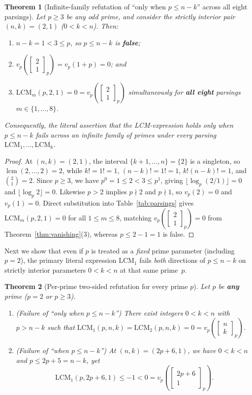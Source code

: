 \documentclass[11pt,a4paper]{article}
\newtheorem{theorem}{Theorem}[section]
\theoremstyle{definition}
\theoremstyle{remark}
\newcommand{\qbinom}[3]{\begin{bmatrix} #1 \\ #2 \end{bmatrix}_{#3}}
\newcommand{\lcm}{\operatorname{lcm}}
\begin{document}
\begin{theorem}[Infinite-family refutation of ``only when $p \le n - k$'' across all eight parsings]
\label{thm:odd-family}
Let $p \ge 3$ be any odd prime, and consider the strictly interior pair
$(n,k) = (2,1)$ ($0 < k < n$). Then:
\begin{enumerate}
  \item $n - k = 1 < 3 \le p$, so $p \le n - k$ is \textbf{false};
  \item $v_p\!\left(\qbinom{2}{1}{p}\right) = v_p(1 + p) = 0$; and
  \item $\mathrm{LCM}_m(p,2,1) = 0 = v_p\!\left(\qbinom{2}{1}{p}\right)$
    simultaneously for \textbf{all eight} parsings $m \in \{1,\dots,8\}$.
\end{enumerate}
Consequently, the literal assertion that the LCM-expression holds \emph{only when}
$p \le n - k$ fails across an infinite family of primes under every parsing
$\mathrm{LCM}_1,\dots,\mathrm{LCM}_8$.
\end{theorem}

\begin{proof}
At $(n,k) = (2,1)$, the interval $\{k+1,\dots,n\} = \{2\}$ is a singleton, so
$\lcm(2,\dots,2) = 2$, while $k! = 1! = 1$, $(n-k)! = 1! = 1$, $k!(n-k)! = 1$, and
$\binom{2}{1} = 2$. Since $p \ge 3$, we have $p^0 = 1 \le 2 < 3 \le p^1$, giving
$\lfloor \log_p(2/1)\rfloor = 0$ and $\lfloor \log_p 2\rfloor = 0$. Likewise $p > 2$
implies $p \nmid 2$ and $p \nmid 1$, so $v_p(2) = 0$ and $v_p(1) = 0$. Direct
substitution into Table~\ref{tab:parsings} gives $\mathrm{LCM}_m(p,2,1) = 0$ for all
$1 \le m \le 8$, matching $v_p\!\left(\qbinom{2}{1}{p}\right) = 0$ from
Theorem~\ref{thm:vanishing}(3), whereas $p \le 2 - 1 = 1$ is false.
\end{proof}

Next we show that even if $p$ is treated as a \emph{fixed} prime parameter (including
$p = 2$), the primary literal expression $\mathrm{LCM}_1$ fails \emph{both} directions
of $p \le n - k$ on strictly interior parameters $0 < k < n$ at that same prime~$p$.

\begin{theorem}[Per-prime two-sided refutation for every prime $p$]
\label{thm:per-prime}
Let $p$ be \textbf{any} prime ($p = 2$ or $p \ge 3$).
\begin{enumerate}
  \item \emph{(Failure of ``only when $p \le n - k$'')} There exist integers
    $0 < k < n$ with $p > n - k$ such that
    $\mathrm{LCM}_1(p,n,k) = \mathrm{LCM}_2(p,n,k) = 0
    = v_p\!\left(\qbinom{n}{k}{p}\right)$.
  \item \emph{(Failure of ``when $p \le n - k$'')} At $(n,k) = (2p+6, 1)$, we have
    $0 < k < n$ and $p \le 2p + 5 = n - k$, yet
    \[
      \mathrm{LCM}_1(p, 2p+6, 1) \le -1 < 0 = v_p\!\left(\qbinom{2p+6}{1}{p}\right).
    \]
\end{enumerate}
\end{theorem}
\end{document}

